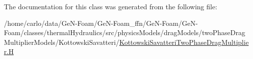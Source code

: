 The documentation for this class was generated from the following file\+:\begin{DoxyCompactItemize}
\item 
/home/carlo/data/\+Ge\+N-\/\+Foam/\+Ge\+N-\/\+Foam\+\_\+ffn/\+Ge\+N-\/\+Foam/\+Ge\+N-\/\+Foam/classes/thermal\+Hydraulics/src/physics\+Models/drag\+Models/two\+Phase\+Drag\+Multiplier\+Models/\+Kottowski\+Savatteri/\hyperlink{KottowskiSavatteriTwoPhaseDragMultiplier_8H}{Kottowski\+Savatteri\+Two\+Phase\+Drag\+Multiplier.\+H}\end{DoxyCompactItemize}
